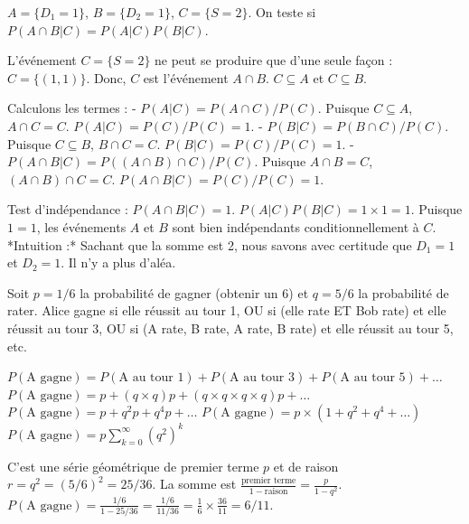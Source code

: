 \begin{correctionbox}
$A = \{D_1=1\}$, $B = \{D_2=1\}$, $C = \{S=2\}$.
On teste si $P(A \cap B | C) = P(A|C) P(B|C)$.

L'événement $C = \{S=2\}$ ne peut se produire que d'une seule façon : $C = \{(1,1)\}$.
Donc, $C$ est l'événement $A \cap B$. $C \subseteq A$ et $C \subseteq B$.

Calculons les termes :
- $P(A|C) = P(A \cap C) / P(C)$. Puisque $C \subseteq A$, $A \cap C = C$.
  $P(A|C) = P(C) / P(C) = 1$.
- $P(B|C) = P(B \cap C) / P(C)$. Puisque $C \subseteq B$, $B \cap C = C$.
  $P(B|C) = P(C) / P(C) = 1$.
- $P(A \cap B | C) = P((A \cap B) \cap C) / P(C)$. Puisque $A \cap B = C$, $(A \cap B) \cap C = C$.
  $P(A \cap B | C) = P(C) / P(C) = 1$.

Test d'indépendance :
$P(A \cap B | C) = 1$.
$P(A|C) P(B|C) = 1 \times 1 = 1$.
Puisque $1=1$, les événements $A$ et $B$ sont bien indépendants conditionnellement à $C$.
*Intuition :* Sachant que la somme est 2, nous savons avec certitude que $D_1=1$ et $D_2=1$. Il n'y a plus d'aléa.
\end{correctionbox}

\begin{correctionbox}
Soit $p=1/6$ la probabilité de gagner (obtenir un 6) et $q=5/6$ la probabilité de rater.
Alice gagne si elle réussit au tour 1, OU si (elle rate ET Bob rate) et elle réussit au tour 3, OU si (A rate, B rate, A rate, B rate) et elle réussit au tour 5, etc.

$P(\text{A gagne}) = P(\text{A au tour 1}) + P(\text{A au tour 3}) + P(\text{A au tour 5}) + \dots$
$P(\text{A gagne}) = p + (q \times q)p + (q \times q \times q \times q)p + \dots$
$P(\text{A gagne}) = p + q^2 p + q^4 p + \dots$
$P(\text{A gagne}) = p \times (1 + q^2 + q^4 + \dots)$
$P(\text{A gagne}) = p \sum_{k=0}^{\infty} (q^2)^k$

C'est une série géométrique de premier terme $p$ et de raison $r = q^2 = (5/6)^2 = 25/36$.
La somme est $\frac{\text{premier terme}}{1 - \text{raison}} = \frac{p}{1 - q^2}$.
$P(\text{A gagne}) = \frac{1/6}{1 - 25/36} = \frac{1/6}{11/36} = \frac{1}{6} \times \frac{36}{11} = 6/11$.
\end{correctionbox}

